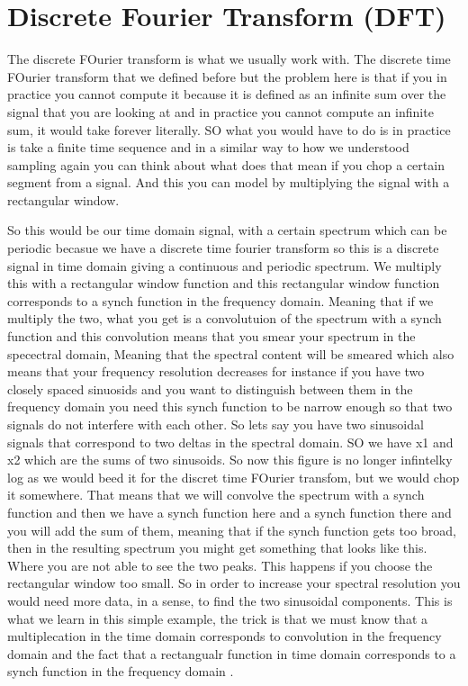\clearpage
\section{Discrete Fourier Transform (DFT)}
\label{Discrete Fourier Transform (DFT)}

 The discrete FOurier transform is what we usually work with.  The discrete time FOurier transform that we defined before but the problem here is that if you in  practice you cannot compute it because it is defined as an infinite sum over the signal that you are looking at and in practice you cannot compute an infinite sum, it would take forever literally.  SO what you would have to do is in practice is take a finite time sequence and in a similar way to how we understood sampling again you can think about what does that mean if you chop a certain segment from a signal. And this you can model by multiplying the signal with a rectangular window.
 
 So this would be our time domain signal, with a certain spectrum which can be periodic becasue we have a discrete time fourier transform so this is a discrete signal in time domain giving a continuous and periodic spectrum.  We multiply this with a rectangular window function and this rectangular window function corresponds to a synch function in the frequency domain.  Meaning that if we multiply the two, what you get is a convolutuion of the spectrum with a synch function and this convolution means that you smear your spectrum in the specectral domain,  Meaning that the spectral content will be smeared which also means that your frequency resolution decreases for instance if you have two closely spaced sinuosids and you want to distinguish between them in the frequency domain you need this synch function to be narrow enough so that two signals do not interfere with each other. So lets say 
you have two sinusoidal signals that correspond to two deltas in the spectral domain.  SO we have x1 and x2 which are the sums of two sinusoids. So  now this figure is no longer infintelky log as we would beed it for the discret time FOurier transfom, but we would chop it somewhere.  That means that we will convolve the spectrum with a synch function and then we have a synch function here and a synch function there and you will add the sum of them, meaning that if the synch function gets too broad, then in the resulting spectrum you might get something that looks like this.  Where you are not able to see the two peaks.  This happens if you choose the rectangular window too small.  So in order to increase your spectral resolution you would need more data, in a sense, to find the two sinusoidal components. This is what we learn in this simple example, the trick is that we must know that a multiplecation in the time domain corresponds to convolution in the frequency domain and the fact that a rectangualr function in time domain corresponds to a synch function in the frequency domain .

